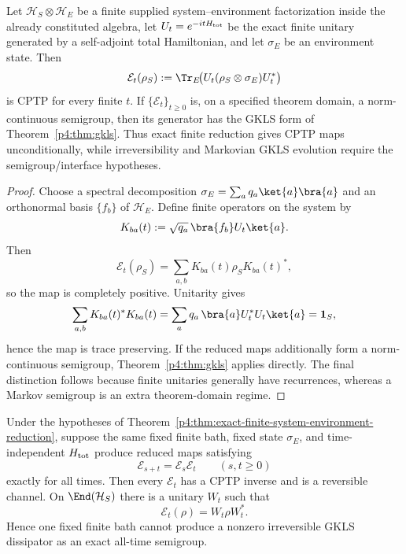 \documentclass[12pt,a4paper]{article}
\begin{document}
\begin{theorem}
\label{p4:thm:exact-finite-system-environment-reduction}
Let \(\mathcal H_S\otimes\mathcal H_E\) be a finite supplied
system--environment factorization inside the already constituted algebra,
let \(U_t=e^{-itH_{\rm tot}}\) be the exact finite unitary generated by a
self-adjoint total Hamiltonian, and let \(\sigma_E\) be an environment
state.  Then
\[
\mathcal E_t(\rho_S)
:=
\Tr_E\!\bigl(U_t(\rho_S\otimes\sigma_E)U_t^*\bigr)
\]
is CPTP for every finite \(t\).  If \(\{\mathcal E_t\}_{t\ge0}\) is, on a
specified theorem domain, a norm-continuous semigroup, then its generator
has the GKLS form of Theorem~\ref{p4:thm:gkls}.  Thus exact finite
reduction gives CPTP maps unconditionally, while irreversibility and
Markovian GKLS evolution require the semigroup/interface hypotheses.
\end{theorem}

\begin{proof}
Choose a spectral decomposition
\(\sigma_E=\sum_a q_a\ket{a}\bra{a}\) and an orthonormal basis
\(\{f_b\}\) of \(\mathcal H_E\).  Define finite operators on the system by
\[
K_{ba}(t):=\sqrt{q_a}\,\bra{f_b}U_t\ket{a}.
\]
Then
\[
\mathcal E_t(\rho_S)=\sum_{a,b}K_{ba}(t)\rho_S K_{ba}(t)^*,
\]
so the map is completely positive.  Unitarity gives
\[
\sum_{a,b}K_{ba}(t)^*K_{ba}(t)
=
\sum_a q_a\,\bra{a}U_t^*U_t\ket{a}
=
\mathbf1_S,
\]
hence the map is trace preserving.  If the reduced maps additionally form
a norm-continuous semigroup, Theorem~\ref{p4:thm:gkls} applies directly.
The final distinction follows because finite unitaries generally have
recurrences, whereas a Markov semigroup is an extra theorem-domain regime.
\end{proof}

\begin{theorem}
\label{p4:thm:fixed-finite-bath-semigroup-rigidity}
Under the hypotheses of
Theorem~\ref{p4:thm:exact-finite-system-environment-reduction}, suppose the
same fixed finite bath, fixed state \(\sigma_E\), and time-independent
\(H_{\rm tot}\) produce reduced maps satisfying
\[
 \mathcal E_{s+t}=\mathcal E_s\mathcal E_t
 \qquad(s,t\ge0)
\]
exactly for all times.  Then every \(\mathcal E_t\) has a CPTP inverse and is
a reversible channel.  On \(\End(\mathcal H_S)\) there is a unitary \(W_t\)
such that
\[
 \boxed{\mathcal E_t(\rho)=W_t\rho W_t^*.}
\]
Hence one fixed finite bath cannot produce a nonzero irreversible GKLS
dissipator as an exact all-time semigroup.
\end{theorem}
\end{document}
